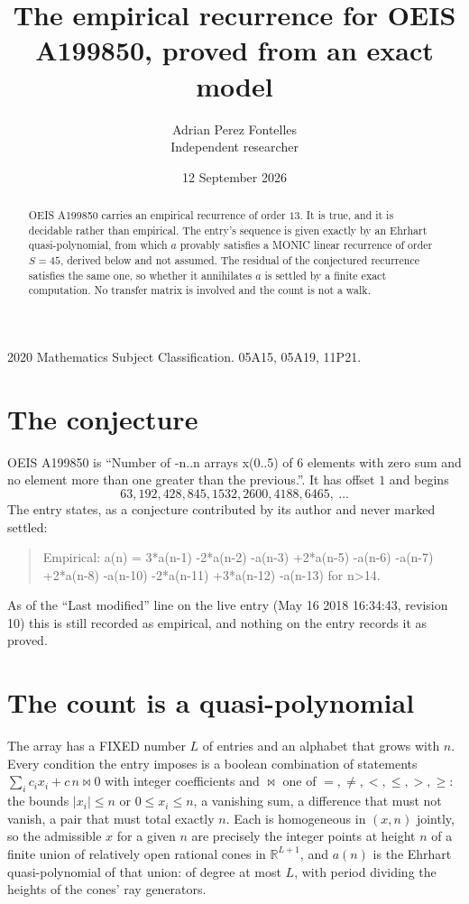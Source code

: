 \documentclass[11pt,a4paper]{article}
\title{The empirical recurrence for OEIS A199850, proved from an exact model}
\author{Adrian Perez Fontelles\\ \small Independent researcher}
\date{12 September 2026}
\theoremstyle{plain}
\theoremstyle{definition}
\begin{document}
\maketitle

\begin{abstract}
OEIS A199850 carries an empirical recurrence of order $13$. It is true, and it is
decidable rather than empirical. The entry's sequence is given exactly by an Ehrhart quasi-polynomial, from
which $a$ provably satisfies a MONIC linear recurrence of order $S=45$, derived below and not
assumed. The residual of the conjectured recurrence satisfies the same one, so whether it
annihilates $a$ is settled by a finite exact computation. No transfer matrix is involved and
the count is not a walk.
\end{abstract}

\noindent\small 2020 Mathematics Subject Classification. 05A15, 05A19, 11P21.\normalsize

\section{The conjecture}

OEIS A199850 is ``Number of -n..n arrays x(0..5) of 6 elements with zero sum and no element more than one greater than the previous.''. It has offset $1$ and begins
\[
63, 192, 428, 845, 1532, 2600, 4188, 6465,\ \dots
\]
The entry states, as a conjecture contributed by its author and never marked settled:
\begin{quote}
Empirical: a(n) = 3*a(n-1) -2*a(n-2) -a(n-3) +2*a(n-5) -a(n-6) -a(n-7) +2*a(n-8) -a(n-10) -2*a(n-11) +3*a(n-12) -a(n-13) for n>14.
\end{quote}
As of the ``Last modified'' line on the live entry (May 16 2018 16:34:43, revision 10)
this is still recorded as empirical, and nothing on the entry records it as proved.

\section{The count is a quasi-polynomial}

The array has a FIXED number $L$ of entries and an alphabet that grows with $n$. Every
condition the entry imposes is a boolean combination of statements
$\sum_i c_ix_i + c\,n \bowtie 0$ with integer coefficients and $\bowtie$ one of
$=,\ne,<,\le,>,\ge$: the bounds $|x_i|\le n$ or $0\le x_i\le n$, a vanishing sum, a difference
that must not vanish, a pair that must total exactly $n$. Each is homogeneous in $(x,n)$
jointly, so the admissible $x$ for a given $n$ are precisely the integer points at height $n$
of a finite union of relatively open rational cones in $\mathbb{R}^{L+1}$, and $a(n)$ is
the Ehrhart quasi-polynomial of that union: of degree at most $L$, with period dividing the
heights of the cones' ray generators.
\end{document}
